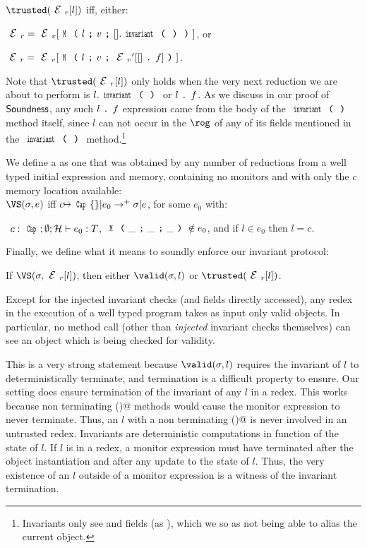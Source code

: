 \indent $\trusted(\ER[l])$ iff, either:
\begin{iitemize}
\item $\ER=\EV[\M{l}{v}{\hole.\invariant}]$, or
\item $\ER=\EV[\M{l}{v}{\EV'[\hole\singleDot f]}]$.
\end{iitemize}
Note that $\trusted(\ER[l])$ only holds when the very next reduction we are about to perform is $l.\invariant$ or $l{ \mbox{ {\texttt{.}} } } f$.
As we discuss in our proof of $\textsf{Soundness}$,
any such $l{ \mbox{ {\texttt{.}} } } f$ expression came from the body of the $\invariant$ method itself, since $l$ can not occur in the $\rog$ of any of its fields mentioned in the $\invariant$ method.\footnote{
Invariants only see \Q@imm@ and \Q@capsule@ fields (as \Q@read@), which we so as not being able to alias
  the current object.}

We define a \VS as one that was obtained by any number of reductions from a well typed initial expression and memory, containing no monitors and with only the $c$ memory location available:\\
\indent $\VS(\s, e)$ iff $c\mapsto\Kw{Cap}\{\}|e_0\rightarrow^+ \s|e$, for some $e_0$ with:
\begin{iitemize}
\item[] ${}_{}$\quad${}_{}$ $c:\Kw{Cap};\emptyset; \h \vdash e_0: 	T$, $\M{\_}{\_}{\_} \notin e_0$, and if $l \in e_0$ then $l = c$.
\end{iitemize}

\noindent Finally, we define what it means to soundly enforce our invariant protocol:
\SS\begin{theorem}[Soundness]\rm
If $\VS(\s, \ER[l])$, then either $\valid(\s,l)$ or $\trusted(\ER[l])$.
\end{theorem}
Except for the injected invariant checks (and fields directly accessed),
any redex in the execution of a well typed program takes as input only valid objects.
In particular, no method call (other than \emph{injected} invariant checks themselves) can see an object which is being checked for validity.

This is a very strong statement because $\valid(\s,l)$ requires 
the invariant of $l$ to deterministically terminate, and termination is a difficult 
property to ensure.
Our setting does ensure termination of the invariant of any $l$ in a redex.
This works because non terminating \Q@invariant()@ methods would cause the monitor expression to never terminate. Thus, an
$l$ with a non terminating \Q@invariant()@ is never involved in an untrusted redex.
Invariants are deterministic computations in function of the state of $l$.
If $l$ is in a redex, a monitor expression must have terminated after the object instantiation
and after any update to the state of $l$.
Thus, the very existence of an $l$ outside of a monitor expression
is a witness of the invariant termination.

